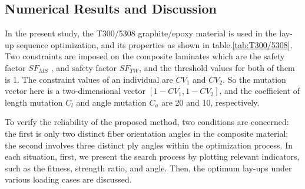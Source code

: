 \subsection{Numerical Results and Discussion}
In the present study, the T300/5308 graphite/epoxy material is used in the
lay-up sequence optimization, and its properties as shown in
table.\ref{tab:T300/5308}. Two constraints are imposed on the composite
laminates which are the safety factor $SF_{MS}$ , and safety factor $SF_{TW}$,
and the threshold values for both of them is 1. The constraint values of an
individual are $CV_1$ and $CV_2$. So the mutation vector here is a two-dimensional
vector $[1 - CV_1, 1 - CV_2 ]$, and the coefficient of length
mutation $C_l$ and angle mutation $C_a$ are  20 and 10, respectively.

To verify the reliability of the proposed method, two conditions are concerned: the
first is only two distinct fiber orientation angles in the composite material;
the second involves three distinct ply angles within the optimization process.
In each situation, first, we present the search process by plotting relevant
indicators, such as the fitness, strength ratio, and angle. Then, the optimum
lay-ups under various loading cases are discussed.

